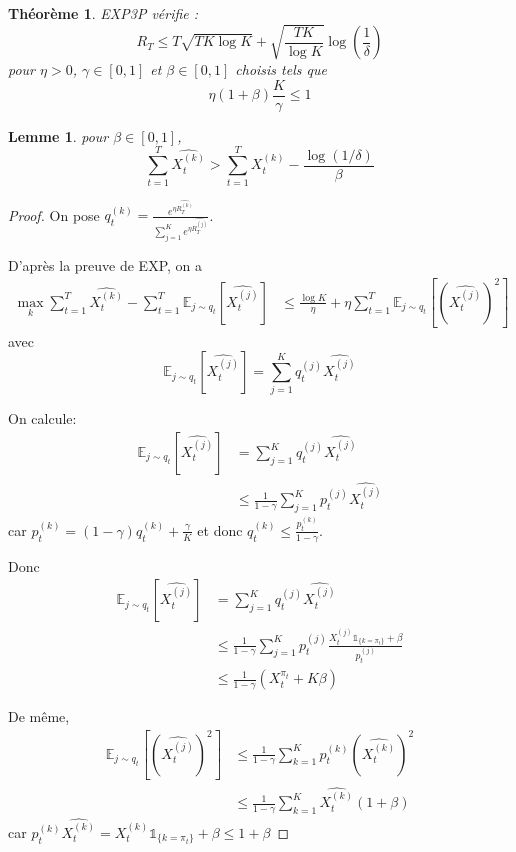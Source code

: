 \documentclass{article}
\newtheorem{theorem}{Théorème}[section]
\newtheorem{lemma}{Lemme}[section]
\theoremstyle{remark}
\theoremstyle{remark}
\begin{document}
\begin{theorem}
   EXP3P vérifie :
   $$
   R_T \leq T \sqrt{T K \log K} + \sqrt{\frac{T K}{\log K}} \log\left(\frac{1}{\delta}\right)
   $$
   pour $\eta > 0$, $\gamma \in [0,1]$ et $\beta \in [0,1]$ choisis tels que
   $$
   \eta (1+\beta) \frac{K}{\gamma} \leq 1
   $$
\end{theorem}

\begin{lemma}
   pour $\beta \in [0,1]$,
   $$
   \sum_{t=1}^T \widehat{X_t^{(k)}} > \sum_{t=1}^T X_t^{(k)} - \frac{\log(1/\delta)}{\beta}
   $$
\end{lemma}

\begin{proof}
   On pose $q_t^{(k)} = \frac{e^{\eta \widehat{R_T^{(k)}}}}{\sum\limits_{j=1}^Ke^{\eta \widehat{R_T^{(j)}}}}$.

   D'après la preuve de EXP, on a
   \begin{align}
      \max_k \sum_{t=1}^T \widehat{X_t^{(k)}} - \sum_{t=1}^T \mathbb{E}_{j \sim q_t}\left[\widehat{X_t^{(j)}}\right]
      &\leq \frac{\log K}{\eta} + \eta \sum_{t=1}^T \mathbb{E}_{j \sim q_t}\left[\left(\widehat{X_t^{(j)}}\right)^2\right]
      \label{eq:EXP}
   \end{align}
   avec
   $$
   \mathbb{E}_{j \sim q_t}\left[\widehat{X_t^{(j)}}\right] = \sum_{j=1}^K q_t^{(j)} \widehat{X_t^{(j)}}
   $$

   On calcule:
   \begin{align*}
      \mathbb{E}_{j \sim q_t}\left[\widehat{X_t^{(j)}}\right] &= \sum_{j=1}^K q_t^{(j)} \widehat{X_t^{(j)}} \\
      &\leq \frac{1}{1-\gamma} \sum_{j=1}^K p_t^{(j)} \widehat{X_t^{(j)}}
   \end{align*}
   car $p_t^{(k)} = (1-\gamma) q_t^{(k)} + \frac{\gamma}{K}$ et donc $q_t^{(k)} \leq \frac{p_t^{(k)}}{1-\gamma}$.

   Donc
   \begin{align*}
      \mathbb{E}_{j \sim q_t}\left[\widehat{X_t^{(j)}}\right] &= \sum_{j=1}^K q_t^{(j)} \widehat{X_t^{(j)}} \\
      &\leq \frac{1}{1-\gamma} \sum_{j=1}^K p_t^{(j)} \frac{X_t^{(j)} \mathbb{1}_{\{k=\pi_t\}} + \beta}{p_t^{(j)}} \\
      &\leq  \frac{1}{1-\gamma} \left(X_t^{\pi_t} + K \beta\right)
   \end{align*}

   De même,
   \begin{align*}
      \mathbb{E}_{j \sim q_t}\left[\left(\widehat{X_t^{(j)}}\right)^2\right] &\leq \frac{1}{1 - \gamma} \sum_{k=1}^K p_t^{(k)} \left(\widehat{X_t^{(k)}}\right)^2 \\
      &\leq \frac{1}{1-\gamma} \sum_{k=1}^K \widehat{X_t^{(k)}} (1+\beta)
   \end{align*}
   car $p_t^{(k)}\widehat{X_t^{(k)}} = X_t^{(k)} \mathbb{1}_{\{k = \pi_t\}} + \beta \leq 1 + \beta$


\end{proof}
\end{document}
